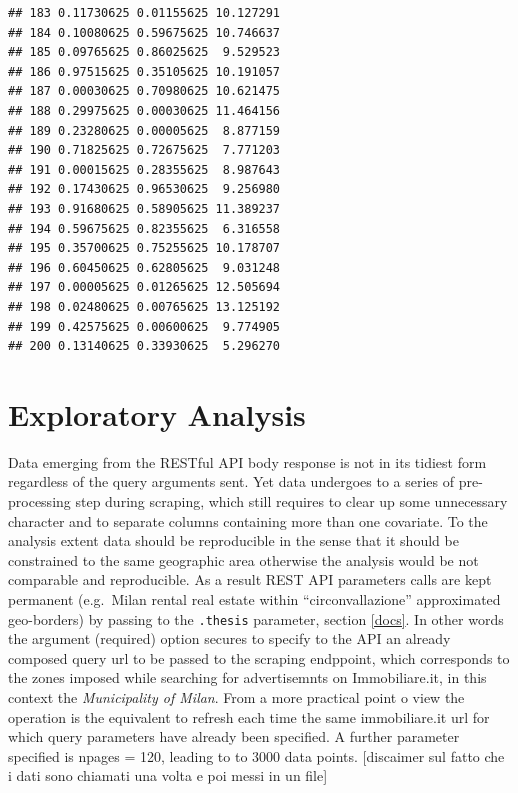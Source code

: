 \documentclass[
  12pt,
  a4paper,
  oneside]{book}
\newcommand{\passthrough}[1]{#1}
\theoremstyle{definition}
\theoremstyle{definition}
\theoremstyle{definition}
\theoremstyle{remark}
\begin{document}
\begin{lstlisting}
## 183 0.11730625 0.01155625 10.127291
## 184 0.10080625 0.59675625 10.746637
## 185 0.09765625 0.86025625  9.529523
## 186 0.97515625 0.35105625 10.191057
## 187 0.00030625 0.70980625 10.621475
## 188 0.29975625 0.00030625 11.464156
## 189 0.23280625 0.00005625  8.877159
## 190 0.71825625 0.72675625  7.771203
## 191 0.00015625 0.28355625  8.987643
## 192 0.17430625 0.96530625  9.256980
## 193 0.91680625 0.58905625 11.389237
## 194 0.59675625 0.82355625  6.316558
## 195 0.35700625 0.75255625 10.178707
## 196 0.60450625 0.62805625  9.031248
## 197 0.00005625 0.01265625 12.505694
## 198 0.02480625 0.00765625 13.125192
## 199 0.42575625 0.00600625  9.774905
## 200 0.13140625 0.33930625  5.296270
\end{lstlisting}

\hypertarget{exploratory}{%
\chapter{Exploratory Analysis}\label{exploratory}}

Data emerging from the RESTful API body response is not in its tidiest form regardless of the query arguments sent. Yet data undergoes to a series of pre-processing step during scraping, which still requires to clear up some unnecessary character and to separate columns containing more than one covariate. To the analysis extent data should be reproducible in the sense that it should be constrained to the same geographic area otherwise the analysis would be not comparable and reproducible. As a result REST API parameters calls are kept permanent (e.g.~Milan rental real estate within ``circonvallazione'' approximated geo-borders) by passing to the \passthrough{\lstinline!.thesis!} parameter, section \ref{docs}. In other words the argument (required) option secures to specify to the API an already composed query url to be passed to the scraping endppoint, which corresponds to the zones imposed while searching for advertisemnts on Immobiliare.it, in this context the \emph{Municipality of Milan}. From a more practical point o view the operation is the equivalent to refresh each time the same immobiliare.it url for which query parameters have already been specified. A further parameter specified is npages = 120, leading to to 3000 data points. {[}discaimer sul fatto che i dati sono chiamati una volta e poi messi in un file{]}
\end{document}
